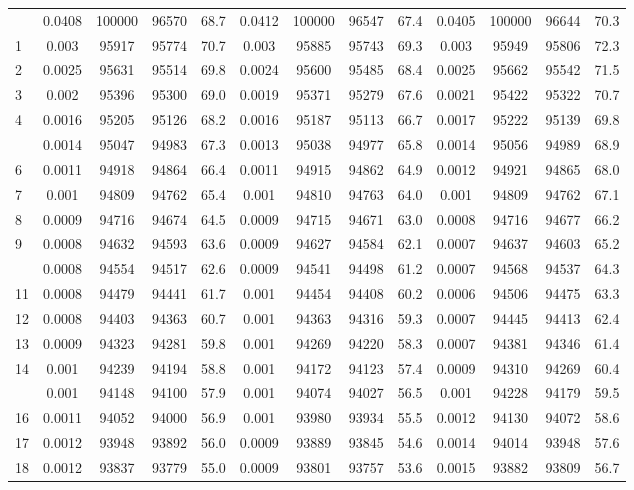 \documentclass[
  14pt,
]{article}
\begin{document}
\begin{longtable}[t]{lcccccccccccc}
\endfoot
\bottomrule
\endlastfoot
0 & 0.0408 & 100000 & 96570 & 68.7 & 0.0412 & 100000 & 96547 & 67.4 & 0.0405 & 100000 & 96644 & 70.3\\
1 & 0.003 & 95917 & 95774 & 70.7 & 0.003 & 95885 & 95743 & 69.3 & 0.003 & 95949 & 95806 & 72.3\\
2 & 0.0025 & 95631 & 95514 & 69.8 & 0.0024 & 95600 & 95485 & 68.4 & 0.0025 & 95662 & 95542 & 71.5\\
3 & 0.002 & 95396 & 95300 & 69.0 & 0.0019 & 95371 & 95279 & 67.6 & 0.0021 & 95422 & 95322 & 70.7\\
4 & 0.0016 & 95205 & 95126 & 68.2 & 0.0016 & 95187 & 95113 & 66.7 & 0.0017 & 95222 & 95139 & 69.8\\
\addlinespace
5 & 0.0014 & 95047 & 94983 & 67.3 & 0.0013 & 95038 & 94977 & 65.8 & 0.0014 & 95056 & 94989 & 68.9\\
6 & 0.0011 & 94918 & 94864 & 66.4 & 0.0011 & 94915 & 94862 & 64.9 & 0.0012 & 94921 & 94865 & 68.0\\
7 & 0.001 & 94809 & 94762 & 65.4 & 0.001 & 94810 & 94763 & 64.0 & 0.001 & 94809 & 94762 & 67.1\\
8 & 0.0009 & 94716 & 94674 & 64.5 & 0.0009 & 94715 & 94671 & 63.0 & 0.0008 & 94716 & 94677 & 66.2\\
9 & 0.0008 & 94632 & 94593 & 63.6 & 0.0009 & 94627 & 94584 & 62.1 & 0.0007 & 94637 & 94603 & 65.2\\
\addlinespace
10 & 0.0008 & 94554 & 94517 & 62.6 & 0.0009 & 94541 & 94498 & 61.2 & 0.0007 & 94568 & 94537 & 64.3\\
11 & 0.0008 & 94479 & 94441 & 61.7 & 0.001 & 94454 & 94408 & 60.2 & 0.0006 & 94506 & 94475 & 63.3\\
12 & 0.0008 & 94403 & 94363 & 60.7 & 0.001 & 94363 & 94316 & 59.3 & 0.0007 & 94445 & 94413 & 62.4\\
13 & 0.0009 & 94323 & 94281 & 59.8 & 0.001 & 94269 & 94220 & 58.3 & 0.0007 & 94381 & 94346 & 61.4\\
14 & 0.001 & 94239 & 94194 & 58.8 & 0.001 & 94172 & 94123 & 57.4 & 0.0009 & 94310 & 94269 & 60.4\\
\addlinespace
15 & 0.001 & 94148 & 94100 & 57.9 & 0.001 & 94074 & 94027 & 56.5 & 0.001 & 94228 & 94179 & 59.5\\
16 & 0.0011 & 94052 & 94000 & 56.9 & 0.001 & 93980 & 93934 & 55.5 & 0.0012 & 94130 & 94072 & 58.6\\
17 & 0.0012 & 93948 & 93892 & 56.0 & 0.0009 & 93889 & 93845 & 54.6 & 0.0014 & 94014 & 93948 & 57.6\\
18 & 0.0012 & 93837 & 93779 & 55.0 & 0.0009 & 93801 & 93757 & 53.6 & 0.0015 & 93882 & 93809 & 56.7\\

\end{longtable}
\end{document}
